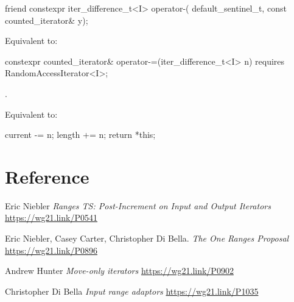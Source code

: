 \documentclass{wg21}
\begin{document}
%
\begin{itemdecl}
	friend constexpr iter_difference_t<I> operator-(
	default_sentinel_t, const counted_iterator& y);
\end{itemdecl}

\begin{itemdescr}
	\pnum
	\effects Equivalent to: 
\end{itemdescr}

%
\begin{itemdecl}
	constexpr counted_iterator& operator-=(iter_difference_t<I> n)
	requires RandomAccessIterator<I>;
\end{itemdecl}

\begin{itemdescr}
	\pnum
	\expects {}.
	
	\pnum
	\effects Equivalent to:
	\begin{codeblock}
		current -= n;
		length += n;
		return *this;
	\end{codeblock}
\end{itemdescr}

\section{Reference}
\begin{thebibliography}{9}
	
	Eric Niebler
	\emph{ Ranges TS: Post-Increment on Input and Output Iterators}\newline
	\url{https://wg21.link/P0541}
	
	Eric Niebler, Casey Carter, Christopher Di Bella.
	\emph{The One Ranges Proposal}\newline
	\url{https://wg21.link/P0896}
	
	Andrew Hunter
	\emph{Move-only iterators}\newline
	\url{https://wg21.link/P0902}

	Christopher Di Bella
	\emph{Input range adaptors}\newline
	\url{https://wg21.link/P1035}	
	
	
\end{thebibliography}
\end{document}
